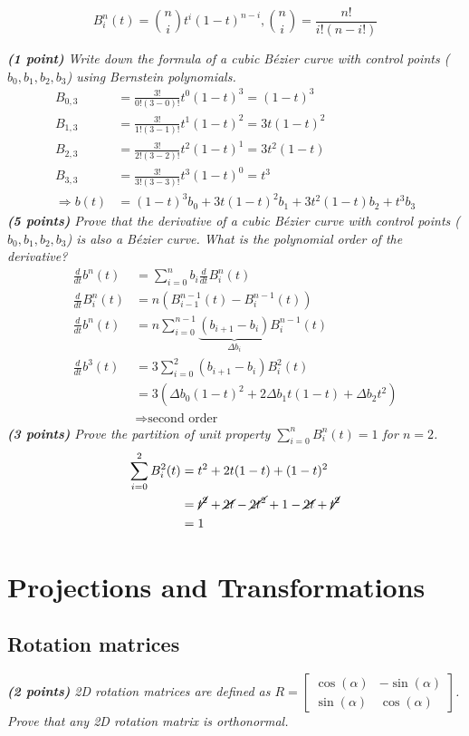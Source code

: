 \documentclass[a4paper,10pt]{article}
\begin{document}
\[B_i^n(t)=\binom{n}{i}t^i(1-t)^{n-i},\binom{n}{i}=\frac{n!}{i!(n-i!)}\]

\textit{\textbf{(1 point)} Write down the formula of a cubic Bézier curve with control points ($b_0,b_1,b_2,b_3$) using Bernstein polynomials.}\\


\[\begin{aligned} 
B_{0,3}&=\frac{3!}{0!(3-0)!}t^0(1-t)^{3}=(1-t)^{3}\\
B_{1,3}&=\frac{3!}{1!(3-1)!}t^1(1-t)^{2}=3t(1-t)^{2}\\
B_{2,3}&=\frac{3!}{2!(3-2)!}t^2(1-t)^{1}=3t^2(1-t)\\
B_{3,3}&=\frac{3!}{3!(3-3)!}t^3(1-t)^{0}=t^{3}\\
\Rightarrow b(t)&=(1-t)^3b_0+3t(1-t)^{2}b_1+3t^2(1-t)b_2+t^3b_3
\end{aligned}\]
\textit{\textbf{(5 points)} Prove that the derivative of a cubic Bézier curve with control points ($b_0,b_1,b_2,b_3$) is also a Bézier curve. What is the polynomial order of the derivative?}
\[\begin{aligned} 
\frac{d}{dt}b^n(t)&=\sum_{i=0}^nb_i\frac{d}{dt}B_i^n(t)\\
\frac{d}{dt}B_i^n(t)&=n(B_{i-1}^{n-1}(t) - B_{i}^{n-1}(t))\\
\frac{d}{dt}b^n(t)&=n\sum_{i=0}^{n-1} \underbrace{(b_{i+1}-b_i)}_{\Delta b_i}B_i^{n-1}(t)\\
\frac{d}{dt}b^3(t)&=3\sum_{i=0}^{2} (b_{i+1}-b_i)B_i^{2}(t)\\
&=3(\Delta b_0(1-t)^2+ 2\Delta b_1 t (1-t) +\Delta b_2t^2)\\
& \Rightarrow \text{second order}
\end{aligned}\]
\textit{\textbf{(3 points)} Prove the partition of unit property $\sum_{i=0}^nB_i^n(t)=1$ for $n=2$.}
\[\begin{aligned} 
\sum_{i=0}^2B_i^2(t)&=t^2+2t(1-t)+(1-t)^2\\
&=\cancel{t^2}+\cancel{2t}-\cancel{2t^2}+1-\cancel{2t}+\cancel{t^2}\\
&=1
\end{aligned}\]

\section{Projections and Transformations}
\subsection{Rotation matrices}
\textit{\textbf{(2 points)} 2D rotation matrices are defined as $R=\begin{bmatrix}
	\cos(\alpha)&-\sin(\alpha)\\ 
	\sin(\alpha)&\cos(\alpha)
	\end{bmatrix}$. Prove that any 2D rotation matrix is orthonormal.}\\
\end{document}
